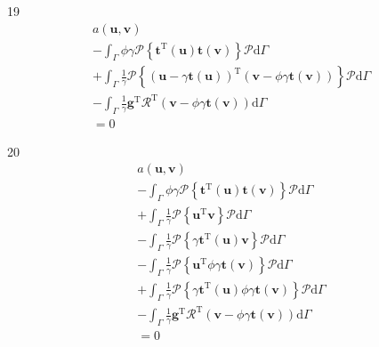 \documentclass[a4paper,12pt]{article}
\begin{document}
19
\begin{equation}
\begin{split}
a(\mathbf{u},\mathbf{v})
\\-
\int_\Gamma
\phi\gamma
\mathcal{P}
\left\{
\mathbf{t}^{\textrm{T}}(\mathbf{u})
\mathbf{t}(\mathbf{v})
\right\}
\mathcal{P}
\textrm{d}\Gamma
\\+
\int_\Gamma
\frac{1}{\gamma}
\mathcal{P}
\left\{
(
\mathbf{u}-\gamma\mathbf{t}(\mathbf{u})
)^\textrm{T}
(\mathbf{v}-\phi\gamma\mathbf{t}(\mathbf{v}))
\right\}
\mathcal{P}
\textrm{d}\Gamma
\\-
\int_\Gamma
\frac{1}{\gamma}
\mathbf{g}^\textrm{T}\mathcal{R}^\textrm{T}
(\mathbf{v}-\phi\gamma\mathbf{t}(\mathbf{v}))
\textrm{d}\Gamma
\\=
0
\end{split}
\end{equation}

20
\begin{equation}
\begin{split}
a(\mathbf{u},\mathbf{v})
\\-
\int_\Gamma
\phi\gamma
\mathcal{P}
\left\{
\mathbf{t}^{\textrm{T}}(\mathbf{u})
\mathbf{t}(\mathbf{v})
\right\}
\mathcal{P}
\textrm{d}\Gamma
\\+
\int_\Gamma
\frac{1}{\gamma}
\mathcal{P}
\left\{
\mathbf{u}^\textrm{T}
\mathbf{v}
\right\}
\mathcal{P}
\textrm{d}\Gamma
\\-
\int_\Gamma
\frac{1}{\gamma}
\mathcal{P}
\left\{
\gamma\mathbf{t}^\textrm{T}(\mathbf{u})
\mathbf{v}
\right\}
\mathcal{P}
\textrm{d}\Gamma
\\-
\int_\Gamma
\frac{1}{\gamma}
\mathcal{P}
\left\{
\mathbf{u}^\textrm{T}
\phi\gamma\mathbf{t}(\mathbf{v})
\right\}
\mathcal{P}
\textrm{d}\Gamma
\\+
\int_\Gamma
\frac{1}{\gamma}
\mathcal{P}
\left\{
\gamma\mathbf{t}^\textrm{T}(\mathbf{u})
\phi\gamma\mathbf{t}(\mathbf{v})
\right\}
\mathcal{P}
\textrm{d}\Gamma
\\-
\int_\Gamma
\frac{1}{\gamma}
\mathbf{g}^\textrm{T}\mathcal{R}^\textrm{T}
(\mathbf{v}-\phi\gamma\mathbf{t}(\mathbf{v}))
\textrm{d}\Gamma
\\=
0
\end{split}
\end{equation}
\end{document}
